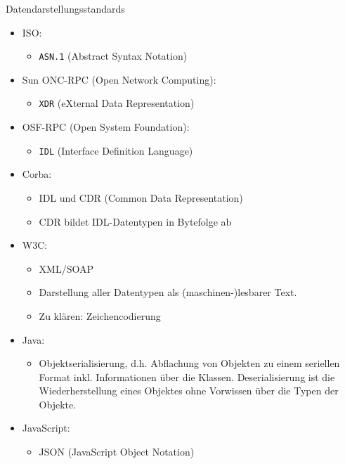 \begin{example}{Datendarstellungsstandards}
    \begin{itemize}
        \item ISO:

              \begin{itemize}
                  \item \texttt{ASN.1} (Abstract Syntax Notation)
              \end{itemize}
        \item Sun ONC-RPC (Open Network Computing):

              \begin{itemize}
                  \item \texttt{XDR} (eXternal Data Representation)
              \end{itemize}
        \item OSF-RPC (Open System Foundation):

              \begin{itemize}
                  \item \texttt{IDL} (Interface Definition Language)
              \end{itemize}
        \item Corba:

              \begin{itemize}
                  \item IDL und CDR (Common Data Representation)
                  \item CDR bildet IDL-Datentypen in Bytefolge ab
              \end{itemize}
        \item W3C:

              \begin{itemize}
                  \item XML/SOAP
                  \item Darstellung aller Datentypen als (maschinen-)lesbarer Text.
                  \item Zu klären: Zeichencodierung
              \end{itemize}
        \item Java:

              \begin{itemize}
                  \item Objektserialisierung, d.h. Abflachung von Objekten zu einem seriellen Format inkl. Informationen über die Klassen.
                        Deserialisierung ist die Wiederherstellung eines Objektes ohne Vorwissen über die Typen der Objekte.
              \end{itemize}
        \item JavaScript:

              \begin{itemize}
                  \item JSON (JavaScript Object Notation)
              \end{itemize}
    \end{itemize}
\end{example}

